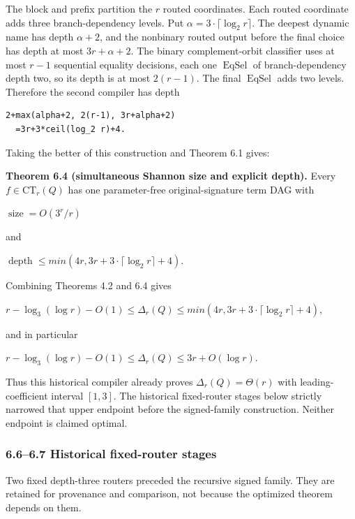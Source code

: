 \documentclass[
  11pt,
]{article}
\theoremstyle{definition}
\theoremstyle{remark}
\begin{document}
The block and prefix partition the \(r\) routed coordinates. Each routed
coordinate adds three branch-dependency levels. Put
\(\alpha=3\mathbin{\cdot}\lceil \log_2 r \rceil\). The deepest dynamic
name has depth \(\alpha+2\), and the nonbinary routed output before the
final choice has depth at most \(3r+\alpha+2\). The binary
complement-orbit classifier uses at most \(r-1\) sequential equality
decisions, each one \(\operatorname{EqSel}\) of branch-dependency depth
two, so its depth is at most \(2(r-1)\). The final
\(\operatorname{EqSel}\) adds two levels. Therefore the second compiler
has depth

\begin{lstlisting}
2+max(alpha+2, 2(r-1), 3r+alpha+2)
  =3r+3*ceil(log_2 r)+4.
\end{lstlisting}

Taking the better of this construction and Theorem 6.1 gives:

\textbf{Theorem 6.4 (simultaneous Shannon size and explicit depth).}
Every \(f \in \mathrm{CT}_r(Q)\) has one parameter-free
original-signature term DAG with

\(\operatorname{size}=O(3^r/r)\)

and

\(\operatorname{depth}\le min(4r,3r+3\mathbin{\cdot}\lceil \log_2 r \rceil+4)\).

Combining Theorems 4.2 and 6.4 gives

\(r-\log_3(\log r)-O(1) \le  \Delta_r(Q) \le  min(4r,3r+3\mathbin{\cdot}\lceil \log_2 r \rceil+4)\),

and in particular

\(r-\log_3(\log r)-O(1) \le  \Delta_r(Q) \le  3r+O(\log r)\).

Thus this historical compiler already proves \(\Delta_r(Q)=\Theta(r)\)
with leading-coefficient interval \([1,3]\). The historical fixed-router
stages below strictly narrowed that upper endpoint before the
signed-family construction. Neither endpoint is claimed optimal.

\hypertarget{historical-fixed-router-stages}{%
\subsubsection{6.6--6.7 Historical fixed-router
stages}\label{historical-fixed-router-stages}}

Two fixed depth-three routers preceded the recursive signed family. They
are retained for provenance and comparison, not because the optimized
theorem depends on them.
\end{document}
